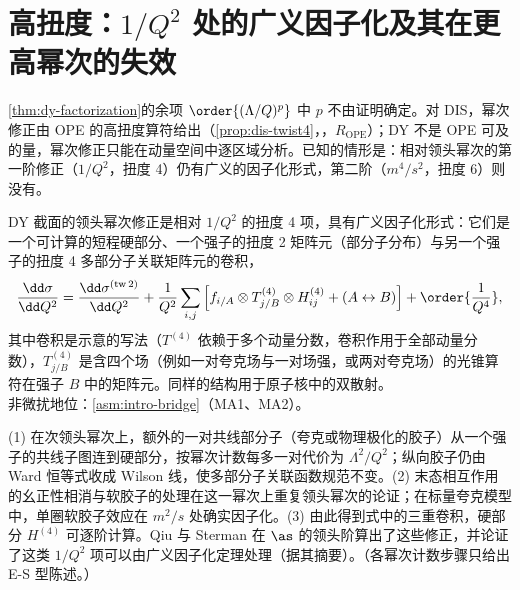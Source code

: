 \section{高扭度：\texorpdfstring{$1/Q^2$}{1/Q2} 处的广义因子化及其在更高幂次的失效}\label{sec:dy-twist}

\cref{thm:dy-factorization}的余项 $\order{(\Lambda/Q)^p}$ 中 $p$ 不由证明确定。对 DIS，幂次修正由 OPE 的高扭度算符给出（\cref{prop:dis-twist4}，\tagR，$R_{\mathrm{OPE}}$）；DY 不是 OPE 可及的量，幂次修正只能在动量空间中逐区域分析。已知的情形是：相对领头幂次的第一阶修正（$1/Q^2$，扭度 4）仍有广义的因子化形式，第二阶（$m^4/s^2$，扭度 6）则没有。

\begin{theorem}\label{thm:dy-higher-twist}
DY 截面的领头幂次修正是相对 $1/Q^2$ 的扭度 4 项，具有广义因子化形式：它们是一个可计算的短程硬部分、一个强子的扭度 2 矩阵元（部分子分布）与另一个强子的扭度 4 多部分子关联矩阵元的卷积，
\[
\frac{\dd\sigma}{\dd Q^2}=\frac{\dd\sigma^{(\rm tw\,2)}}{\dd Q^2}+\frac{1}{Q^2}\sum_{i,j}\Big[f_{i/A}\otimes T^{(4)}_{j/B}\otimes H^{(4)}_{ij}+(A\leftrightarrow B)\Big]+\order{\frac{1}{Q^4}},
\]
其中卷积是示意的写法（$T^{(4)}$ 依赖于多个动量分数，卷积作用于全部动量分数），$T^{(4)}_{j/B}$ 是含四个场（例如一对夸克场与一对场强，或两对夸克场）的光锥算符在强子 $B$ 中的矩阵元\cite{QiuSterman1991a,QiuSterman1991b}。同样的结构用于原子核中的双散射\cite{Kastella:1989ux}。\\
非微扰地位：\cref{asm:intro-bridge}（MA1、MA2）。
\end{theorem}

\begin{proofsketch}
(1) 在次领头幂次上，额外的一对共线部分子（夸克或物理极化的胶子）从一个强子的共线子图连到硬部分，按幂次计数每多一对代价为 $\Lambda^2/Q^2$；纵向胶子仍由 Ward 恒等式收成 Wilson 线，使多部分子关联函数规范不变。(2) 末态相互作用的幺正性相消与软胶子的处理在这一幂次上重复领头幂次的论证；在标量夸克模型中，单圈软胶子效应在 $m^2/s$ 处确实因子化\cite{Basu:1984ba}。(3) 由此得到式中的三重卷积，硬部分 $H^{(4)}$ 可逐阶计算。Qiu 与 Sterman 在 $\as$ 的领头阶算出了这些修正，并论证了这类 $1/Q^2$ 项可以由广义因子化定理处理\cite{QiuSterman1991a,QiuSterman1991b}（据其摘要）。（各幂次计数步骤只给出 E-S 型陈述。）
\end{proofsketch}

